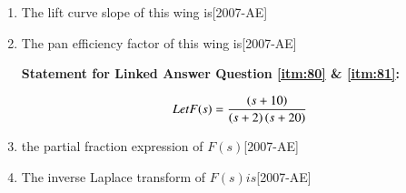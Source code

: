\documentclass[journal]{IEEEtran}
\begin{document}
\begin{enumerate}
    \item The lift curve slope of this wing is\label{itm:78}\hfill{[2007-AE]}
        \begin{enumerate}
        \end{enumerate}
    \item The pan efficiency factor of this wing is\label{itm:79}\hfill{[2007-AE]}
        \begin{enumerate}
        \end{enumerate}

\textbf{Statement for Linked Answer Question \ref{itm:80} \& \ref{itm:81}:}

$$Let F(s) = \frac{\left(s+10\right)}{\left(s+2\right)\left(s+20\right)}$$

    \item the partial fraction expression of $F(s)$\label{itm:80}\hfill{[2007-AE]}
        \begin{enumerate}
        \end{enumerate}
    \item The inverse Laplace transform of $F(s) is$\label{itm:81}\hfill{[2007-AE]}
        \begin{enumerate}
        \end{enumerate}


\end{enumerate}
\end{document}
